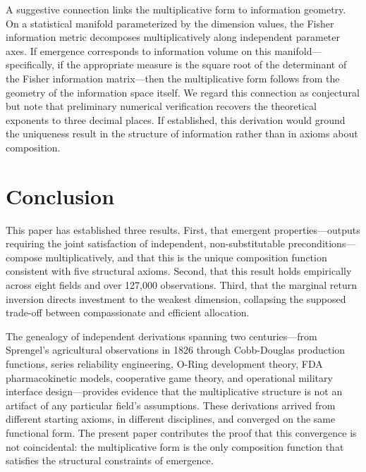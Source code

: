 \documentclass[12pt, a4paper]{article}
\theoremstyle{definition}
\theoremstyle{remark}
\begin{document}
A suggestive connection links the multiplicative form to information geometry. On a statistical manifold parameterized by the dimension values, the Fisher information metric decomposes multiplicatively along independent parameter axes. If emergence corresponds to information volume on this manifold---specifically, if the appropriate measure is the square root of the determinant of the Fisher information matrix---then the multiplicative form follows from the geometry of the information space itself. We regard this connection as conjectural but note that preliminary numerical verification recovers the theoretical exponents to three decimal places. If established, this derivation would ground the uniqueness result in the structure of information rather than in axioms about composition.


\section{Conclusion}\label{sec:conclusion}

This paper has established three results. First, that emergent properties---outputs requiring the joint satisfaction of independent, non-substitutable preconditions---compose multiplicatively, and that this is the unique composition function consistent with five structural axioms. Second, that this result holds empirically across eight fields and over 127,000 observations. Third, that the marginal return inversion directs investment to the weakest dimension, collapsing the supposed trade-off between compassionate and efficient allocation.

The genealogy of independent derivations spanning two centuries---from Sprengel's agricultural observations in 1826 through Cobb-Douglas production functions, series reliability engineering, O-Ring development theory, FDA pharmacokinetic models, cooperative game theory, and operational military interface design---provides evidence that the multiplicative structure is not an artifact of any particular field's assumptions. These derivations arrived from different starting axioms, in different disciplines, and converged on the same functional form. The present paper contributes the proof that this convergence is not coincidental: the multiplicative form is the only composition function that satisfies the structural constraints of emergence.
\end{document}
